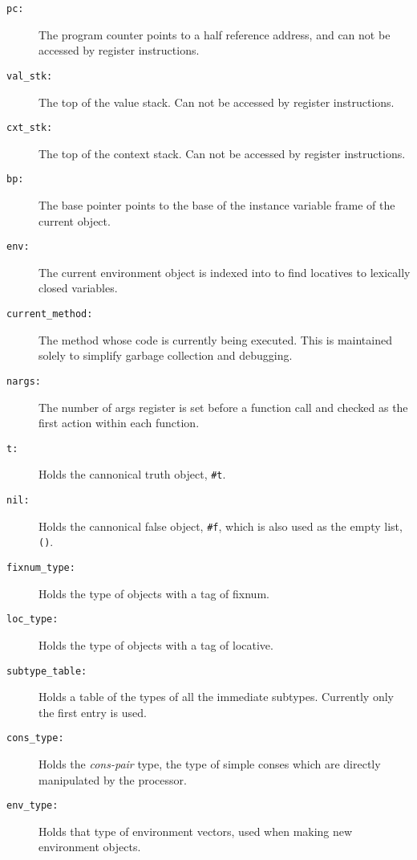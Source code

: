 \begin{description}

\item[\tt pc:] The program counter points to a half reference
address, and can not be accessed by register instructions.

\item[\tt val\_stk:] The top of the value stack.  Can not be accessed by
register instructions.

\item[\tt cxt\_stk:] The top of the context stack.  Can not be accessed by
register instructions.

\item[\tt bp:] The base pointer points to the base of the instance variable frame
of the current object.

\item[\tt env:] The current environment object is indexed into to find
locatives to lexically closed variables.

\item[\tt current\_method:] The method whose code is currently being
executed.  This is maintained solely to simplify garbage collection
and debugging.

\item[\tt nargs:] The number of args register is set before a function
call and checked as the first action within each function.

\item[\tt t:] Holds the cannonical truth object, \texttt{\#t}.

\item[\tt nil:] Holds the cannonical false object, \texttt{\#f}, which is also
used as the empty list, \texttt{()}.

\item[\tt fixnum\_type:] Holds the type of objects with a tag of fixnum.

\item[\tt loc\_type:] Holds the type of objects with a tag of locative.

\item[\tt subtype\_table:] Holds a table of the types of all the immediate
subtypes.  Currently only the first entry is used.

\item[\tt cons\_type:] Holds the \emph{cons-pair} type, the type of simple
conses which are directly manipulated by the processor.

\item[\tt env\_type:] Holds that type of environment vectors, used when
making new environment objects.


\end{description}
